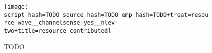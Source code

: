 \begin{figure}[!htbp]
\begin{center}

\texttt{[image: script\_hash=TODO\_source\_hash=TODO\_emp\_hash=TODO+treat=resource-wave\_\_channelsense-yes\_\_nlev-two+title=resource\_contributed]}
\caption{
TODO
}
\label{fig:resource_contributed}
\end{center}
\end{figure}
